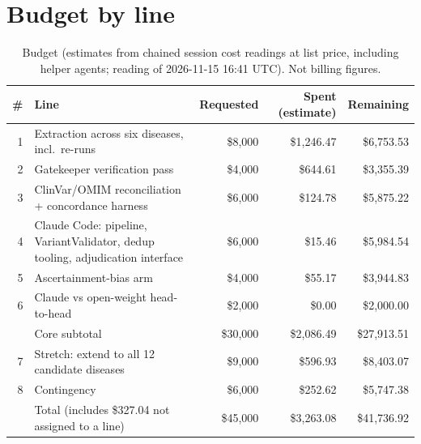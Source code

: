 \documentclass{article} %
\begin{document}
\section{Budget by line}
\label{app:budget}
\begin{table}[h]
\caption{Budget (estimates from chained session cost readings at list price, including helper agents; reading of 2026-11-15 16:41 UTC). Not billing figures.}
\begin{center}
\scriptsize
\begin{tabular}{rlrrr}
\toprule
\# & Line & Requested & Spent (estimate) & Remaining \\
\midrule
1 & Extraction across six diseases, incl.\ re-runs & \$8,000 & \$1,246.47 & \$6,753.53 \\
2 & Gatekeeper verification pass & \$4,000 & \$644.61 & \$3,355.39 \\
3 & ClinVar/OMIM reconciliation + concordance harness & \$6,000 & \$124.78 & \$5,875.22 \\
4 & Claude Code: pipeline, VariantValidator, dedup tooling, adjudication interface & \$6,000 & \$15.46 & \$5,984.54 \\
5 & Ascertainment-bias arm & \$4,000 & \$55.17 & \$3,944.83 \\
6 & Claude vs open-weight head-to-head & \$2,000 & \$0.00 & \$2,000.00 \\
 & Core subtotal & \$30,000 & \$2,086.49 & \$27,913.51 \\
7 & Stretch: extend to all 12 candidate diseases & \$9,000 & \$596.93 & \$8,403.07 \\
8 & Contingency & \$6,000 & \$252.62 & \$5,747.38 \\
 & Total (includes \$327.04 not assigned to a line) & \$45,000 & \$3,263.08 & \$41,736.92 \\
\bottomrule
\end{tabular}
\end{center}
\end{table}
\end{document}
